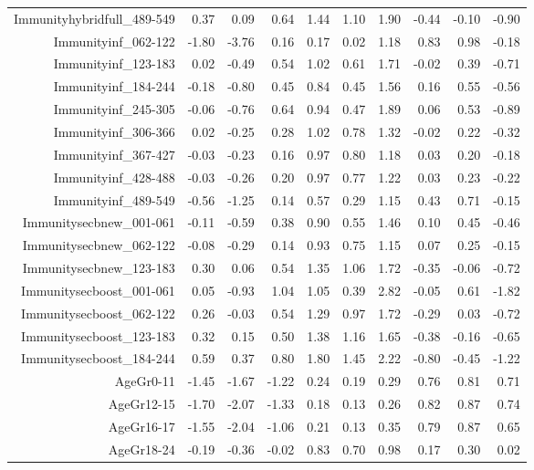 \begin{table}[ht]
\begin{tabular}{rrrrrrrrrr}
  Immunityhybridfull\_489-549 & 0.37 & 0.09 & 0.64 & 1.44 & 1.10 & 1.90 & -0.44 & -0.10 & -0.90 \\ 
  Immunityinf\_062-122 & -1.80 & -3.76 & 0.16 & 0.17 & 0.02 & 1.18 & 0.83 & 0.98 & -0.18 \\ 
  Immunityinf\_123-183 & 0.02 & -0.49 & 0.54 & 1.02 & 0.61 & 1.71 & -0.02 & 0.39 & -0.71 \\ 
  Immunityinf\_184-244 & -0.18 & -0.80 & 0.45 & 0.84 & 0.45 & 1.56 & 0.16 & 0.55 & -0.56 \\ 
  Immunityinf\_245-305 & -0.06 & -0.76 & 0.64 & 0.94 & 0.47 & 1.89 & 0.06 & 0.53 & -0.89 \\ 
  Immunityinf\_306-366 & 0.02 & -0.25 & 0.28 & 1.02 & 0.78 & 1.32 & -0.02 & 0.22 & -0.32 \\ 
  Immunityinf\_367-427 & -0.03 & -0.23 & 0.16 & 0.97 & 0.80 & 1.18 & 0.03 & 0.20 & -0.18 \\ 
  Immunityinf\_428-488 & -0.03 & -0.26 & 0.20 & 0.97 & 0.77 & 1.22 & 0.03 & 0.23 & -0.22 \\ 
  Immunityinf\_489-549 & -0.56 & -1.25 & 0.14 & 0.57 & 0.29 & 1.15 & 0.43 & 0.71 & -0.15 \\ 
  Immunitysecbnew\_001-061 & -0.11 & -0.59 & 0.38 & 0.90 & 0.55 & 1.46 & 0.10 & 0.45 & -0.46 \\ 
  Immunitysecbnew\_062-122 & -0.08 & -0.29 & 0.14 & 0.93 & 0.75 & 1.15 & 0.07 & 0.25 & -0.15 \\ 
  Immunitysecbnew\_123-183 & 0.30 & 0.06 & 0.54 & 1.35 & 1.06 & 1.72 & -0.35 & -0.06 & -0.72 \\ 
  Immunitysecboost\_001-061 & 0.05 & -0.93 & 1.04 & 1.05 & 0.39 & 2.82 & -0.05 & 0.61 & -1.82 \\ 
  Immunitysecboost\_062-122 & 0.26 & -0.03 & 0.54 & 1.29 & 0.97 & 1.72 & -0.29 & 0.03 & -0.72 \\ 
  Immunitysecboost\_123-183 & 0.32 & 0.15 & 0.50 & 1.38 & 1.16 & 1.65 & -0.38 & -0.16 & -0.65 \\ 
  Immunitysecboost\_184-244 & 0.59 & 0.37 & 0.80 & 1.80 & 1.45 & 2.22 & -0.80 & -0.45 & -1.22 \\ 
  AgeGr0-11 & -1.45 & -1.67 & -1.22 & 0.24 & 0.19 & 0.29 & 0.76 & 0.81 & 0.71 \\ 
  AgeGr12-15 & -1.70 & -2.07 & -1.33 & 0.18 & 0.13 & 0.26 & 0.82 & 0.87 & 0.74 \\ 
  AgeGr16-17 & -1.55 & -2.04 & -1.06 & 0.21 & 0.13 & 0.35 & 0.79 & 0.87 & 0.65 \\ 
  AgeGr18-24 & -0.19 & -0.36 & -0.02 & 0.83 & 0.70 & 0.98 & 0.17 & 0.30 & 0.02 \\ 

\end{tabular}
\end{table}
